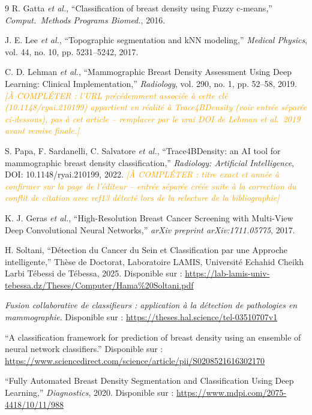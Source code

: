 \documentclass[12pt,a4paper]{report}
\newcommand{\todo}[1]{\textcolor{orange}{\textit{[À COMPLÉTER : #1]}}}
\begin{document}
\begin{thebibliography}{9}
R. Gatta \textit{et al.},
``Classification of breast density using Fuzzy c-means,''
\textit{Comput.\ Methods Programs Biomed.}, 2016.

J. E. Lee \textit{et al.},
``Topographic segmentation and kNN modeling,''
\textit{Medical Physics}, vol. 44, no. 10, pp. 5231--5242, 2017.

C. D. Lehman \textit{et al.},
``Mammographic Breast Density Assessment Using Deep Learning: Clinical Implementation,''
\textit{Radiology}, vol. 290, no. 1, pp. 52--58, 2019.
\todo{l'URL précédemment associée à cette clé (10.1148/ryai.210199)
appartient en réalité à Trace4BDensity (voir entrée séparée ci-dessous), pas
à cet article -- remplacer par le vrai DOI de Lehman et al.\ 2019 avant
remise finale.}

S. Papa, F. Sardanelli, C. Salvatore \textit{et al.},
``Trace4BDensity: an AI tool for mammographic breast density classification,''
\textit{Radiology: Artificial Intelligence}, DOI: 10.1148/ryai.210199, 2022.
\todo{titre exact et année à confirmer sur la page de l'éditeur -- entrée
séparée créée suite à la correction du conflit de citation avec ref13
détecté lors de la relecture de la bibliographie}

K. J. Geras \textit{et al.},
``High-Resolution Breast Cancer Screening with Multi-View Deep Convolutional Neural Networks,''
\textit{arXiv preprint arXiv:1711.05775}, 2017.

H. Soltani,
``Détection du Cancer du Sein et Classification par une Approche intelligente,''
Thèse de Doctorat, Laboratoire LAMIS, Université Echahid Cheikh Larbi Tébessi de Tébessa, 2025.
Disponible sur : \url{https://lab-lamis-univ-tebessa.dz/Theses/Computer/Hama%20Soltani.pdf}

\textit{Fusion collaborative de classifieurs : application à la détection de pathologies en mammographie}.
Disponible sur : \url{https://theses.hal.science/tel-03510707v1}

``A classification framework for prediction of breast density using an ensemble of neural network classifiers.''
Disponible sur : \url{https://www.sciencedirect.com/science/article/pii/S0208521616302170}

``Fully Automated Breast Density Segmentation and Classification Using Deep Learning,''
\textit{Diagnostics}, 2020.
Disponible sur : \url{https://www.mdpi.com/2075-4418/10/11/988}


\end{thebibliography}
\end{document}
